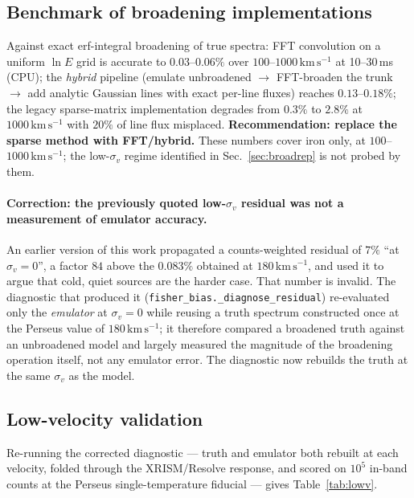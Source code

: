\documentclass[11pt,a4paper]{article}
\newcommand{\kms}{\,\mathrm{km\,s^{-1}}}
\newcommand{\code}[1]{\texttt{#1}}
\begin{document}
\subsection{Benchmark of broadening implementations}

Against exact erf-integral broadening of true spectra: FFT convolution
on a uniform $\ln E$ grid is accurate to $0.03$--$0.06\%$ over
$100$--$1000\kms$ at 10--30\,ms (CPU); the \emph{hybrid} pipeline
(emulate unbroadened $\to$ FFT-broaden the trunk $\to$ add analytic
Gaussian lines with exact per-line fluxes) reaches $0.13$--$0.18\%$;
the legacy sparse-matrix implementation degrades from $0.3\%$ to
$2.8\%$ at $1000\kms$ with $20\%$ of line flux misplaced.
\textbf{Recommendation: replace the sparse method with FFT/hybrid.}
These numbers cover iron only, at $100$--$1000\kms$; the low-$\sigma_v$
regime identified in Sec.~\ref{sec:broadrep} is not probed by them.

\paragraph{Correction: the previously quoted low-$\sigma_v$ residual was
not a measurement of emulator accuracy.} An earlier version of this work
propagated a counts-weighted residual of $7\%$ ``at $\sigma_v=0$'', a
factor $84$ above the $0.083\%$ obtained at $180\kms$, and used it to
argue that cold, quiet sources are the harder case. That number is
invalid. The diagnostic that produced it
(\code{fisher\_bias.\_diagnose\_residual}) re-evaluated only the
\emph{emulator} at $\sigma_v=0$ while reusing a truth spectrum
constructed once at the Perseus value of $180\kms$; it therefore
compared a broadened truth against an unbroadened model and largely
measured the magnitude of the broadening operation itself, not any
emulator error. The diagnostic now rebuilds the truth at the same
$\sigma_v$ as the model.

\subsection{Low-velocity validation}
\label{sec:lowsigmav}

Re-running the corrected diagnostic --- truth and emulator both rebuilt
at each velocity, folded through the XRISM/Resolve response, and scored
on $10^5$ in-band counts at the Perseus single-temperature fiducial ---
gives Table~\ref{tab:lowv}.
\end{document}
